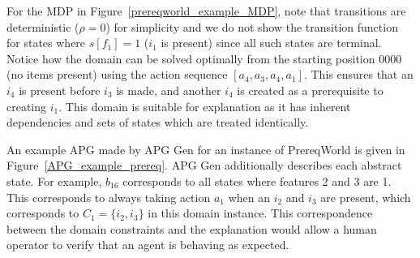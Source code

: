 \documentclass[letterpaper]{article} %
\begin{document}
For the MDP in Figure~\ref{prereqworld_example_MDP},
note that transitions are deterministic ($\rho = 0$) for simplicity and we do not show the transition function for states where $s[f_1] = 1$ ($i_1$ is present) since all such states are terminal.
Notice how the domain can be solved optimally from the starting position $0000$ (no items present) using the action sequence $[a_4, a_3, a_4, a_1]$.
This ensures that an $i_4$ is present before $i_3$ is made, and another $i_4$ is created as a prerequisite to creating $i_1$.
This domain is suitable for explanation as it has inherent dependencies and sets of states which are treated identically.

An example APG made by APG Gen for an instance of PrereqWorld is given in Figure~\ref{APG_example_prereq}. APG Gen additionally describes each abstract state. For example, $b_{16}$ corresponds to all states where features 2 and 3 are 1. This corresponds to always taking action $a_1$ when an $i_2$ and $i_3$ are present, which corresponds to $C_1 = \{i_2, i_3\}$ in this domain instance. This correspondence between the domain constraints and the explanation would allow a human operator to verify that an agent is behaving as expected.
\end{document}
